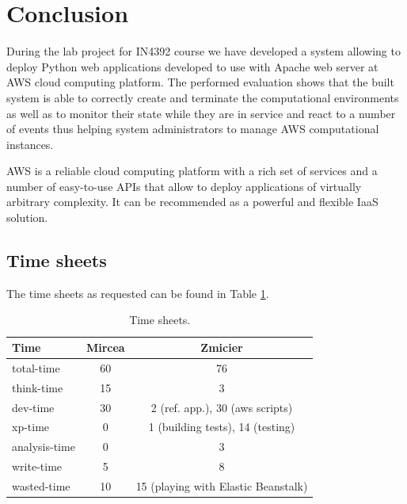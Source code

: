 \documentclass[conference]{IEEEtran}
\begin{document}
\section{Conclusion}

During the lab project for IN4392 course we have developed a system allowing to deploy Python web applications developed to use with Apache web server at AWS cloud computing platform. The performed evaluation shows that the built system is able to correctly create and terminate the computational environments as well as to monitor their state while they are in service and react to a number of events thus helping system administrators to manage AWS computational instances. 

AWS is a reliable cloud computing platform with a rich set of services and a number of easy-to-use APIs that allow to deploy applications of virtually arbitrary complexity. It can be recommended as a powerful and flexible IaaS solution.


\appendix

\subsection{Time sheets}

The time sheets as requested can be found in Table \ref{table-timesheets}.
\begin{table}[ht]
\begin{center}
  \begin{tabular}{ | l | c | c | }
    \hline
    \textbf{Time} & \textbf{Mircea} & \textbf{Zmicier} \\ \hline
    total-time & 60 & 76 \\ \hline
    think-time & 15 & 3 \\ \hline
    dev-time & 30 & 2 (ref. app.), 30 (aws scripts) \\ \hline
    xp-time & 0 & 1 (building tests), 14 (testing) \\ \hline
    analysis-time & 0 & 3 \\ \hline
    write-time & 5 & 8 \\ \hline
    wasted-time & 10 & 15 (playing with Elastic Beanstalk) \\
    \hline
  \end{tabular}
  \caption{Time sheets.}
  \label{table-timesheets}
\end{center}
\end{table}
\end{document}
